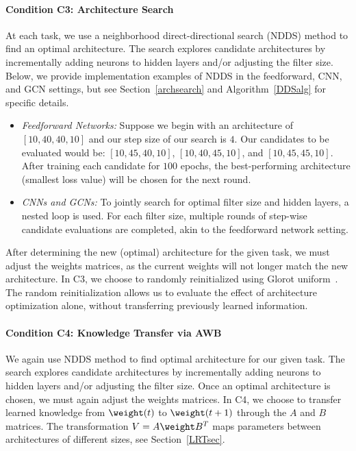 \paragraph{Condition C3: Architecture Search }
At each task, we use a neighborhood direct-directional search (NDDS) method to find an optimal architecture. The search explores candidate architectures by incrementally adding neurons to hidden layers and/or adjusting the filter size. Below, we provide implementation examples of NDDS in the feedforward, CNN, and GCN settings, but see Section~\ref{archsearch} and Algorithm~\ref{DDSalg} for specific details.
\begin{itemize}
    \item \textit{Feedforward Networks:} Suppose we begin with an architecture of $[10,40,40,10]$ and our step size of our search is $4.$ Our candidates to be evaluated would be:  $[10, 45, 40, 10]$, $[10, 40, 45, 10]$, and $[10, 45, 45, 10].$ After training each candidate for $100$ epochs, the best-performing architecture (smallest loss value) will be chosen for the next round.

    \item \textit{CNNs and GCNs:} To jointly search for optimal filter size and hidden layers, a nested loop is used. For each filter size, multiple rounds of step-wise candidate evaluations are completed, akin to the feedforward network setting.
\end{itemize}


After determining the new (optimal) architecture for the given task, we must adjust the weights matrices, as the current weights will not longer match the new architecture. In C3, we choose to randomly reinitialized using Glorot uniform~\cite{GlorotB10}. The random reinitialization allows us to evaluate the effect of architecture optimization alone, without transferring previously learned information.

\paragraph{Condition C4: Knowledge Transfer via AWB }
We again use NDDS method to find optimal architecture for our given task. The search explores candidate architectures by incrementally adding neurons to hidden layers and/or adjusting the filter size. Once an optimal architecture is chosen, we must again adjust the weights matrices. In C4, we choose to transfer learned knowledge from $\weight(t)$ to $\weight(t+1)$ through the $A$ and $B$ matrices. The transformation $V = A \weight B^T$ maps parameters between architectures of different sizes, see Section~\ref{LRTsec}. 

